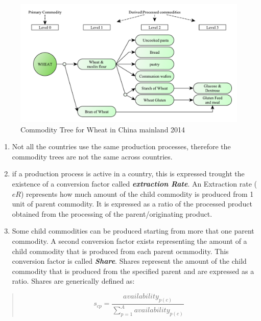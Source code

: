 \documentclass[]{article}
\begin{document}
\begin{figure}[H]

{\centering \includegraphics{images/02_WheatTree} 

}

\caption{\label{fig:f2}Commodity Tree for Wheat in China mainland 2014}\label{fig:f2}
\end{figure}

\begin{enumerate}
\def\labelenumi{\arabic{enumi}.}
\setcounter{enumi}{1}
\item
  Not all the countries use the same production processes, therefore the
  commodity trees are not the same across countries.
\item
  if a production process is active in a country, this is expressed
  trought the existence of a conversion factor called
  \textbf{\emph{extraction Rate}}. An Extraction rate (\(eR\))
  represents how much amount of the child commodity is produced from 1
  unit of parent commodity. It is expressed as a ratio of the processed
  product obtained from the processing of the parent/originating
  product.
\item
  Some child commodities can be produced starting from more that one
  parent commodity. A second conversion factor exists representing the
  amount of a child commodity that is produced from each parent
  ocmmodity. This conversion factor is called \textbf{\emph{Share}}.
  Shares represent the amount of the child commodity that is produced
  from the specified parent and are expressed as a ratio. Shares are
  generically defined as:
\end{enumerate}

\begin{quote}
\begin{equation}
\label{eq:sharesGen}
s_{cp} = \frac{availability_{p(c)}}{\sum \limits_{p=1}^A{availability_{p(c)}}}
\end{equation}
\end{quote}
\end{document}
